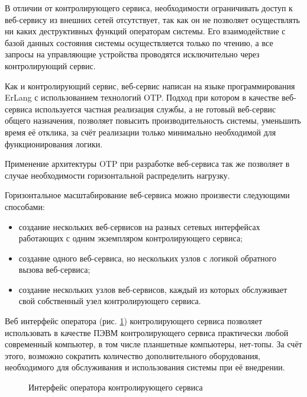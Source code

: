 В отличии от контролирующего сервиса, необходимости ограничивать доступ к веб-сервису из внешних
сетей отсутствует, так как он не позволяет осуществлять ни каких деструктивных функций
операторам системы. Его взаимодействие с базой данных состояния системы осуществляется только по чтению,
а все запросы на управляющие устройства проводятся исключительно через контролирующий сервис.

Как и контролирующий сервис, веб-сервис написан на языке программирования ErLang с использованием технологий
OTP. Подход при котором в качестве веб-сервиса используется частная реализация службы, а не готовый веб-сервис
общего назначения, позволяет повысить производительность системы, уменьшить время её отклика, за счёт реализации
только минимально необходимой для функционирования логики.

Применение архитектуры OTP при разработке веб-сервиса так же позволяет в случае необходимости горизонтальной
распределить нагрузку.

Горизонтальное масштабирование веб-сервиса можно произвести следующими способами:
\begin{itemize}
	\item создание нескольких веб-сервисов на разных сетевых интерфейсах работающих с одним экземпляром
		контролирующего сервиса;
	\item создание одного веб-сервиса, но нескольких узлов с логикой обратного вызова веб-сервиса;
	\item создание нескольких узлов веб-сервисов, каждый из которых обслуживает свой собственный узел
		контролирующего сервиса.
\end{itemize}


Веб интерфейс оператора (рис. \ref{img:acsIf}) контролирующего сервиса позволяет использовать в качестве
ПЭВМ контролирующего сервиса практически любой современный компьютер, в том числе планшетные компьютеры, нет-топы.
За счёт этого, возможно сократить количество дополнительного оборудования, необходимого для обслуживания и использования
системы при её внедрении.

\begin{figure}[ht]
	\caption{Интерфейс оператора контролирующего сервиса}
	\label{img:acsIf}
\end{figure}

